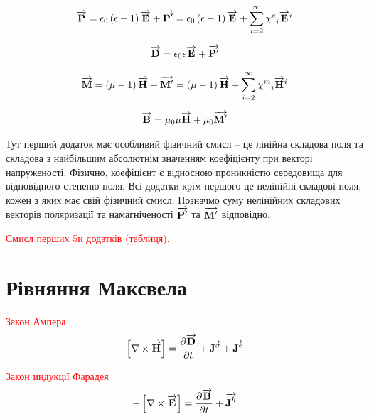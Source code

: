 \begin{equation} \label{eq:polar}
\overrightarrow{\mathbf P} = \epsilon_0 \left( \epsilon - 1 \right) \overrightarrow{\mathbf E} + 
\overrightarrow{\mathbf P^\prime}  = \epsilon_0 \left( \epsilon - 1 \right)
\overrightarrow{\mathbf E} + \sum\limits_{i=2}^\infty  {\chi^e}_i \overrightarrow{\mathbf E}^i 
\end{equation}

\textcolor{lightgray}{ \begin{equation*} \begin{aligned}
\overrightarrow{\mathbf D} = \epsilon_0 \epsilon \overrightarrow{\mathbf E} + \overrightarrow{\mathbf P^\prime}
\end{aligned} \end{equation*} }

\begin{equation} \label{eq:magnit}
\overrightarrow{\mathbf M} = \left( \mu - 1 \right) \overrightarrow{\mathbf H} + 
\overrightarrow{\mathbf M^\prime} = \left( \mu - 1 \right)
\overrightarrow{\mathbf H} + \sum\limits_{i=2}^\infty  {\chi^m}_i \overrightarrow{\mathbf H}^i 
\end{equation}

\textcolor{lightgray}{ \begin{equation*} \begin{aligned}
\overrightarrow{\mathbf B} = \mu_0 \mu  \overrightarrow{\mathbf H} + \mu_0 \overrightarrow{\mathbf M^\prime}
\end{aligned} \end{equation*} }

Тут перший додаток має особливий фізичний смисл -- це лінійна складова поля та 
складова з найбільшим абсолютнім значенням коефіцієнту при векторі 
напруженості. Фізично, коефіцієнт є відносною проникністю середовища для 
відповідного степеню поля. Всі додатки крім першого це нелінійні складові поля,
кожен з яких має свій фізичний смисл.  Позначмо суму нелінійних складових 
векторів поляризації та намагніченості $ \overrightarrow{\mathbf P^\prime} $ та 
$ \overrightarrow{\mathbf M^\prime} $ відповідно.

\textcolor{red}{Смисл перших 5и додатків (таблиця).}

\section{Рівняння Максвела}

\textcolor{red}{Закон Ампера}
\begin{equation} \label{eq:AmpereLow}
\left[ \nabla \times \overrightarrow{\mathbf H} \right] = 
\frac{\partial \overrightarrow{\mathbf D}}{\partial t} + \overrightarrow{\mathbf J^\sigma} + \overrightarrow{\mathbf J^e}
\end{equation}

\textcolor{red}{Закон индукції Фарадея}
\begin{equation} \label{eq:FaradayInduction}
-\left[ \nabla \times \overrightarrow{\mathbf E} \right] =
\frac{\partial \overrightarrow{\mathbf B}}{\partial t} + \overrightarrow{\mathbf J^{h}}
\end{equation}

